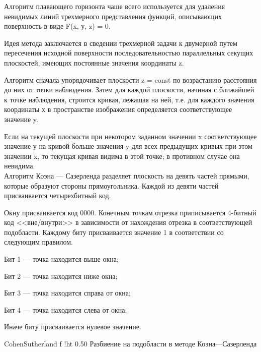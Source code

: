 
Алгоритм плавающего горизонта чаше всего используется для удаления невидимых линий трехмерного представления функций, описывающих поверхность в виде F(x, у, z) = 0.

Идея метода заключается в сведении трехмерной задачи к двумерной путем пересечения исходной поверхности последовательностью параллельных секущих плоскостей, имеющих постоянные значения координаты z.

Алгоритм сначала упорядочивает плоскости z = const по возрастанию расстояния до них от точки наблюдения. Затем для каждой плоскости, начиная с ближайшей к точке наблюдения, строится кривая, лежащая на ней, т.е. для каждого значения координаты х в пространстве изображения определяется соответствующее значение y.

Если на текущей плоскости при некотором заданном значении x соответствующее значение у на кривой больше значения y для всех предыдущих кривых при этом значении x, то текущая кривая видима в этой точке; в противном случае она невидима.\\ %


Алгоритм Коэна --- Сазерленда разделяет плоскость на девять частей прямыми, которые образуют стороны прямоугольника. Каждой из девяти частей присваивается четырехбитный код.

Окну присваивается код 0000. Конечным точкам отрезка приписывается 4-битный код <<вне/внутри>> в зависимости от нахождения отрезка в соответствующей подобласти. Каждому биту присваивается значение 1 в соответствии со следующим правилом.

Бит 1 --- точка находится выше окна;

Бит 2 --- точка находится ниже окна;

Бит 3 --- точка находится справа от окна;

Бит 4 --- точка находится слева от окна;

Иначе биту присваивается нулевое значение.

{CohenSutherland}
{f}
{!ht}
{0.50\textwidth}
{Разбиение на подобласти в методе Коэна---Сазерленда}

